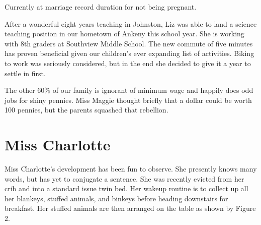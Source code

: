 \documentclass[letterpaper,11pt]{article}
\makeatletter
\newenvironment{figurehere}
  {\def\@captype{figure}}
  {}
\makeatother
\begin{document}
\begin{multicols}{2}
\begin{figurehere}
 \centering   
 \caption{Currently at marriage record duration for not being pregnant.}
\end{figurehere}

After a wonderful eight years teaching in Johnston, Liz was able to land a
science teaching position in our hometown of Ankeny this school year. She is working
with 8th graders at Southview Middle School.  The new commute of five minutes
has proven beneficial given our children's ever expanding list of
activities.  Biking to work was seriously considered, but in the end she
decided to give it a year to settle in first.

The other 60\% of our family is ignorant of minimum wage and happily does odd
jobs for shiny pennies.  Miss Maggie thought briefly that a dollar could be
worth 100 pennies, but the parents squashed that rebellion.

\section{Miss Charlotte}

Miss Charlotte's development has been fun to observe.  She presently knows many
words, but has yet to conjugate a sentence.  She was recently evicted from her
crib and into a standard issue twin bed.  Her wakeup routine is
to collect up all her blankeys, stuffed animals, and binkeys before heading
downstairs for breakfast.  Her stuffed animals are then arranged on the table
as shown by Figure 2.


\end{multicols}
\end{document}

